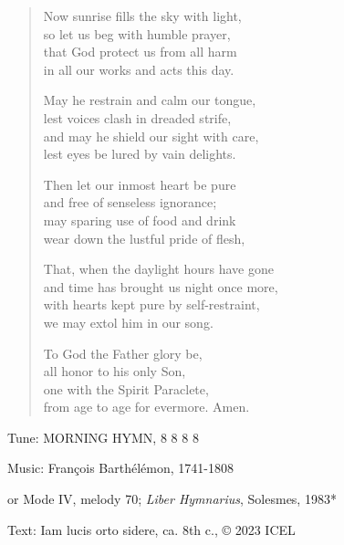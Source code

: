\hymn

\begin{verse}
Now sunrise fills the sky with light,\\
so let us beg with humble prayer,\\
that God protect us from all harm\\
in all our works and acts this day.

May he restrain and calm our tongue,\\
lest voices clash in dreaded strife,\\
and may he shield our sight with care,\\
lest eyes be lured by vain delights.

Then let our inmost heart be pure\\
and free of senseless ignorance;\\
may sparing use of food and drink\\
wear down the lustful pride of flesh,

That, when the daylight hours have gone\\
and time has brought us night once more,\\
with hearts kept pure by self-restraint,\\
we may extol him in our song.

To God the Father glory be,\\
all honor to his only Son,\\
one with the Spirit Paraclete,\\
from age to age for evermore. Amen.
\end{verse}

\begin{hymnsource}
Tune: MORNING HYMN, 8 8 8 8

Music: François Barthélémon, 1741-1808

or Mode IV, melody 70; \emph{Liber Hymnarius}, Solesmes, 1983*

Text: Iam lucis orto sidere, ca. 8th c., © 2023 ICEL
\end{hymnsource}